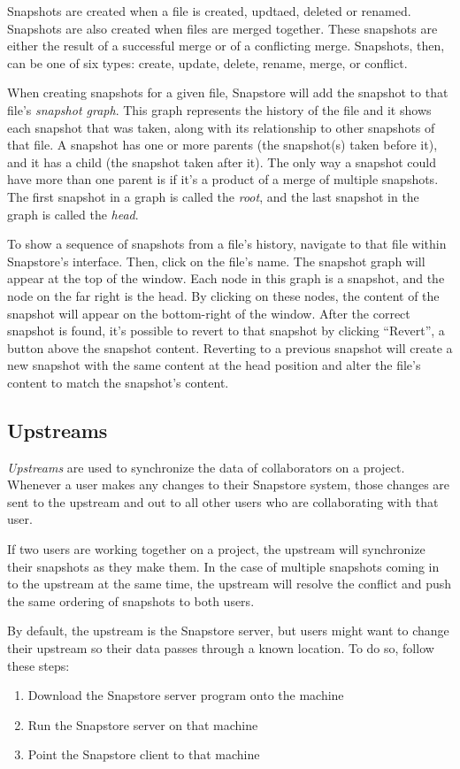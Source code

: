 Snapshots are created when a file is created, updtaed, deleted or renamed. Snapshots are also created when files are merged together. These snapshots are either the result of a successful merge or of a conflicting merge. Snapshots, then, can be one of six types: create, update, delete, rename, merge, or conflict.

When creating snapshots for a given file, Snapstore will add the snapshot to that file's \textit{snapshot graph}. This graph represents the history of the file and it shows each snapshot that was taken, along with its relationship to other snapshots of that file. A snapshot has one or more parents (the snapshot(s) taken before it), and it has a child (the snapshot taken after it). The only way a snapshot could have more than one parent is if it's a product of a merge of multiple snapshots. The first snapshot in a graph is called the \textit{root}, and the last snapshot in the graph is called the \textit{head}.

To show a sequence of snapshots from a file's history, navigate to that file within Snapstore's interface. Then, click on the file's name. The snapshot graph will appear at the top of the window. Each node in this graph is a snapshot, and the node on the far right is the head. By clicking on these nodes, the content of the snapshot will appear on the bottom-right of the window. After the correct snapshot is found, it's possible to revert to that snapshot by clicking ``Revert'', a button above the snapshot content. Reverting to a previous snapshot will create a new snapshot with the same content at the head position and alter the file's content to match the snapshot's content.

\subsection{Upstreams}

\textit{Upstreams} are used to synchronize the data of collaborators on a project. Whenever a user makes any changes to their Snapstore system, those changes are sent to the upstream and out to all other users who are collaborating with that user.

If two users are working together on a project, the upstream will synchronize their snapshots as they make them. In the case of multiple snapshots coming in to the upstream at the same time, the upstream will resolve the conflict and push the same ordering of snapshots to both users.

By default, the upstream is the Snapstore server, but users might want to change their upstream so their data passes through a known location. To do so, follow these steps:
\begin{enumerate}
  \item{Download the Snapstore server program onto the machine}
  \item{Run the Snapstore server on that machine}
  \item{Point the Snapstore client to that machine}
\end{enumerate}

